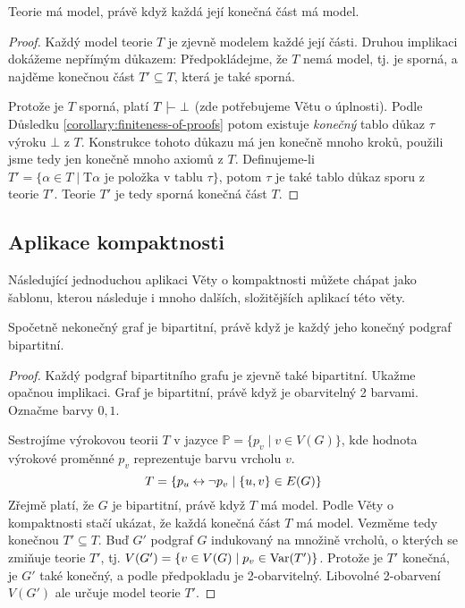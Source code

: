 \begin{theorem}[O kompaktnosti]\label{theorem:compactness-theorem}
Teorie má model, právě když každá její konečná část má model.
\end{theorem}

\begin{proof}
Každý model teorie $T$ je zjevně modelem každé její části. Druhou implikaci dokážeme nepřímým důkazem: Předpokládejme, že $T$ nemá model, tj. je sporná, a najděme konečnou část $T'\subseteq T$, která je také sporná.

Protože je $T$ sporná, platí $T\proves\bot$ (zde potřebujeme Větu o úplnosti). Podle Důsledku \ref{corollary:finiteness-of-proofs} potom existuje \emph{konečný} tablo důkaz $\tau$ výroku $\bot$ z $T$. Konstrukce tohoto důkazu má jen konečně mnoho kroků, použili jsme tedy jen konečně mnoho axiomů z $T$. Definujeme-li $T'=\{\alpha\in T\mid \mathrm{T}\alpha\text{ je položka v tablu $\tau$}\}$, potom $\tau$ je také tablo důkaz sporu z teorie $T'$. Teorie $T'$ je tedy sporná konečná část $T$.
\end{proof}

\subsection{Aplikace kompaktnosti}

Následující jednoduchou aplikaci Věty o kompaktnosti můžete chápat jako šablonu, kterou následuje i mnoho dalších, složitějších aplikací této věty.

\begin{corollary}\label{corollary:infinite-bipartite-compactness}
Spočetně nekonečný graf je bipartitní, právě když je každý jeho konečný podgraf bipartitní.
\end{corollary}

\begin{proof}
    Každý podgraf bipartitního grafu je zjevně také bipartitní. Ukažme opačnou implikaci. Graf je bipartitní, právě když je obarvitelný 2 barvami. Označme barvy $0,1$.

    Sestrojíme výrokovou teorii $T$ v jazyce $\mathbb P=\{p_v\mid v\in V(G)\}$, kde hodnota výrokové proměnné $p_v$ reprezentuje barvu vrcholu $v$.
    $$
        T=\{p_u\mathbin{\leftrightarrow}\neg p_v\mid \{u,v\}\in E(G)\}
    $$
    Zřejmě platí, že $G$ je bipartitní, právě když $T$ má model. Podle Věty o kompaktnosti stačí ukázat, že každá konečná část $T$ má model. Vezměme tedy konečnou $T'\subseteq T$. Buď $G'$ podgraf $G$ indukovaný na množině vrcholů, o kterých se zmiňuje teorie $T'$, tj. $V(G')=\{v\in V(G)\mid p_v\in\operatorname{Var}(T')\}$. Protože je $T'$ konečná, je $G'$ také konečný, a podle předpokladu je 2-obarvitelný. Libovolné 2-obarvení $V(G')$ ale určuje model teorie $T'$.
\end{proof}

